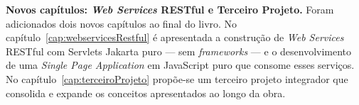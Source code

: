\textbf{Novos capítulos: \textit{Web Services} RESTful e Terceiro Projeto.} Foram adicionados dois novos capítulos ao final do livro. No capítulo~\ref{cap:webservicesRestful} é apresentada a construção de \textit{Web Services} RESTful com Servlets Jakarta puro --- sem \textit{frameworks} --- e o desenvolvimento de uma \textit{Single Page Application} em JavaScript puro que consome esses serviços. No capítulo~\ref{cap:terceiroProjeto} propõe-se um terceiro projeto integrador que consolida e expande os conceitos apresentados ao longo da obra.


\vspace*{\fill}

